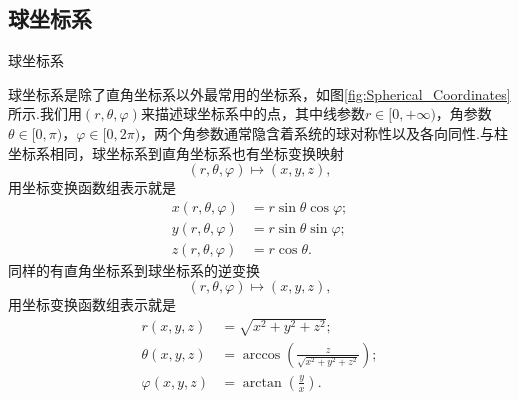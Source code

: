 	\subsection{球坐标系}
			
		\begin{marginfigure}
			\centering
			
			\caption{球坐标系}\label{fig:Spherical_Coordinates}
		\end{marginfigure}
		球坐标系是除了直角坐标系以外最常用的坐标系，如图\ref{fig:Spherical_Coordinates}所示.我们用$(r,\theta,\varphi)$来描述球坐标系中的点，其中线参数$r\in[0,+\infty)$，角参数$\theta\in[0,\pi)$，$\varphi\in[0,2\pi)$，两个角参数通常隐含着系统的球对称性以及各向同性.与柱坐标系相同，球坐标系到直角坐标系也有坐标变换映射
		\begin{equation}\label{eq:rthetaphi to xyz 1}
			(r,\theta,\varphi)\mapsto(x,y,z),
		\end{equation}
		用坐标变换函数组表示就是
		\begin{equation}\label{eq:rthetaphi to xyz 2}
			\begin{split}
				x(r,\theta,\varphi)&=r\sin\theta \cos\varphi;\\
				y(r,\theta,\varphi)&=r\sin\theta \sin\varphi;\\
				z(r,\theta,\varphi)&=r\cos\theta.
			\end{split}
		\end{equation}
		同样的有直角坐标系到球坐标系的逆变换
		\begin{equation}\label{eq:xyz to rthetaphi 1}
			(r,\theta,\varphi)\mapsto(x,y,z),
		\end{equation}
		用坐标变换函数组表示就是
		\begin{equation}\label{eq:xyz to rthetaphi 2}
			\begin{split}
				r(x,y,z)&=\sqrt{x^2+y^2+z^2};\\
				\theta(x,y,z)&=\arccos\left(\frac{z}{\sqrt{x^2+y^2+z^2}}\right);\\
				\varphi(x,y,z)&=\arctan(\frac{y}{x}).
			\end{split}
		\end{equation}

